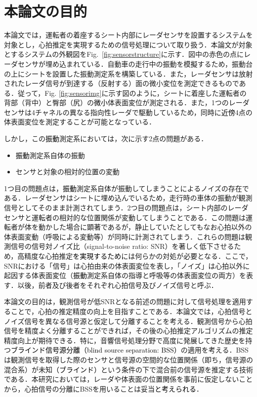 \section{本論文の目的}
本論文では，運転者の着座するシート内部にレーダセンサを設置するシステムを対象とし，心拍推定を実現するための信号処理について取り扱う．本論文が対象とするシステムの外観図をFig.~\ref{fig:sensorstructure}に示す．図中の赤色の点にレーダセンサが埋め込まれている．自動車の走行中の振動を模擬するため，振動台の上にシートを設置した振動測定系を構築している．また，レーダセンサは放射されたレーダ信号が到達する（反射する）面の微小変位を測定できるものである．従って，Fig. \ref{fig:sensorimg}に示す図のように，シートに着座した運転者の背部（背中）と臀部（尻）の\textcolor{black}{微小}体表面変位が測定される．また，1つのレーダセンサは4チャネルの異なる指向性レーダで駆動しているため，同時に\textcolor{black}{近傍}4点の体表面変位を測定することが可能となっている．

しかし，この\textcolor{black}{振動}測定系においては，次に示す2点の問題がある．
\begin{itemize}
	\item \textcolor{black}{振動}測定系自体の振動
	\item センサと対象の相対的位置の変動
\end{itemize}
1つ目の問題点は，\textcolor{black}{振動}測定系自体が振動してしまうことによるノイズの存在である．レーダセンサはシートに埋め込んでいるため，走行時の車体の振動が観測信号としてそのまま計測されてしまう．2つ目の問題点は，シート内部のレーダセンサと運転者の相対的な位置関係が変動してしまうことである．この問題は運転者が体を動かした場合に顕著であるが，静止していたとしてもなお心拍以外の体表面変動（呼吸による変動等）が同時に計測されてしまう．これらの問題は観測信号の信号対ノイズ比（signal-to-noise ratio: SNR）を著しく低下させるため，高精度な心拍推定\textcolor{black}{を実現するため}には何らかの対処が必要となる．ここで，SNRにおける「信号」は心拍由来の体表面変位を表し，「ノイズ」は心拍以外に起因する体表面変位（\textcolor{black}{振動}測定系自体の指導と呼吸等の体表面変位の両方）を表す．以後，前者及び後者をそれぞれ心拍信号及びノイズ信号と呼ぶ．

本論文の目的は，観測信号が低SNRとなる前述の問題に対して信号処理を適用することで，心拍の推定精度の向上を目指すことである．本論文では，心拍信号とノイズ信号を異なる信号源と仮定して分離することを考える．観測信号から心拍信号を精度よく分離することができれば，その後の心拍推定アルゴリズムの推定精度向上が期待できる．特に，音響信号処理分野で高度に発展してきた歴史を持つ\textcolor{black}{ブラインド信号源分離（blind source separation: BSS）}\cite{originica, ica2}の適用を考える．BSSは観測信号を取得した際のセンサと信号源の空間的な位置関係（即ち，信号源の混合系）が未知\textcolor{black}{（ブラインド）}という条件の下で混合前の信号源を推定する技術である．本研究においては，レーダや体表面の位置関係を事前に仮定しないことから，心拍信号の分離にBSSを用いることは妥当\textcolor{black}{と考えられる}．

